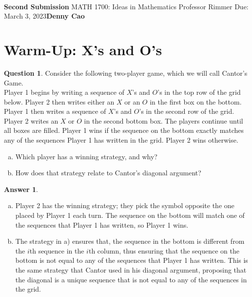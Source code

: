 \documentclass[article, 12pt]{article}
\title{\large\bf{\psetName}}
\makeatletter
\theoremstyle{definition}
\newcommand{\courseNumber}{MATH 1700}
\newcommand{\courseName}{Ideas in Mathematics}
\newcommand{\submission}{Second Submission}
\newcommand{\professor}{Professor Rimmer}
\newcommand{\dueDate}{Due: March 3, 2023}
\newcommand{\name}{Denny Cao}
\newtheorem{question}{Question}
\newtheorem{answer}{Answer}
\renewcommand{\maketitle}{\bgroup\setlength{\parindent}{0pt}
    \begin{flushleft}
        \textbf{\@title} \\ \vskip0.2cm
        \begingroup
            \fontsize{14pt}{12pt}\selectfont
            \textbf{\submission}
            \vskip0.3cm
            \courseNumber: \courseName 
            \vskip0.3cm 
            \professor
        \endgroup \vskip0.3cm
        \dueDate \hfill\rlap{}\bf{\name} \\ \vskip0.1cm
        \hrulefill
    \end{flushleft}\egroup 
}
\makeatother
\begin{document}
    \maketitle
    \thispagestyle{empty}

    \section{Warm-Up: X's and O's}
    
    \begin{question}
        Consider the following two-player game, which we will call Cantor's Game.
        \\[12pt]
        Player 1 begins by writing a sequence of $X$'s and $O$'s in the top row of the grid below.
        Player 2 then writes either an $X$ or an $O$ in the first box on the bottom. Player 1 then
        writes a sequence of $X$'s and $O$'s in the second row of the grid. Player 2 writes an $X$ or $O$ in the second bottom box. The players continue until all boxes are filled. Player 1 wins if the sequence on the bottom exactly matches any of the sequences Player 1 has written in
        the grid. Player 2 wins otherwise.
        \begin{enumerate}[a)]
            \item Which player has a winning strategy, and why?
            \item How does that strategy relate to Cantor's diagonal argument?
        \end{enumerate}
    \end{question}

    \begin{answer} \ 
        \begin{enumerate}[a)] 
            \item Player 2 has the winning strategy; they pick the symbol opposite the one placed by Player 1 each turn. 
            The sequence on the bottom will match one of the sequences that Player 1 has written, so Player 1 wins.
            \item The strategy in a) ensures that, the sequence in the bottom is different from the $i$th sequence in the $i$th column, thus ensuring that the sequence on the bottom is not equal to any of the sequences that Player 1 has written. This is the same strategy that Cantor used in his diagonal argument, proposing that the diagonal is a unique sequence that is not equal to any of the sequences in the grid.
        \end{enumerate}
    \end{answer}
\end{document}

